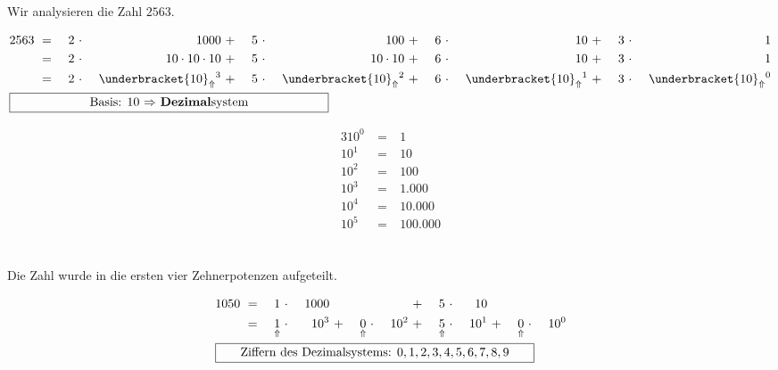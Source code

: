 \begin{example}
Wir analysieren die Zahl $2563$.\\

\begin{minipage}{0.6\textwidth}
\begin{alignat*}{16}
2563 & ~ = ~ & 2 & ~\cdot~ & 1000 & ~ + ~ & 5 & ~\cdot~ & 100 & ~ + ~ & 6 & ~\cdot~ & 10 & ~ + ~ & 3 & ~\cdot~ & 1 \\
& ~ = ~ & 2 & ~\cdot~ & 10 \cdot 10 \cdot 10  & ~ + ~ & 5 & ~\cdot~ & 10 \cdot 10  & ~ + ~ & 6 & ~\cdot~ & 10 & ~ + ~ & 3 & ~\cdot~ & 1 \\
& ~ = ~ & 2 & ~\cdot~ & \underbracket{10}_{\Uparrow}{}^3  & ~ + ~ & 5 & ~\cdot~ & \underbracket{10}_{\Uparrow}{}^2  & ~ + ~ & 6 & ~\cdot~ & \underbracket{10}_{\Uparrow}{}^1 & ~ + ~ & 3 & ~\cdot~ & \underbracket{10}_{\Uparrow}{}^0 \\
\omit\rlap{\framebox[9cm]{Basis: $10$ $\Rightarrow$ \textbf{Dezimal}system}}
\end{alignat*}
\end{minipage}
\hfill
\begin{minipage}{0.3\textwidth}
\begin{alignat*}{3}
10^0 & ~ = ~ & 1	\\
10^1 & ~ = ~ & 10	\\
10^2 & ~ = ~ & 100	\\
10^3 & ~ = ~ & 1.000	\\
10^4 & ~ = ~ & 10.000	\\
10^5 & ~ = ~ & 100.000	\\
\end{alignat*}
\end{minipage}
\\
Die Zahl wurde in die ersten vier Zehnerpotenzen aufgeteilt.
\end{example}

\begin{example}

\begin{alignat*}{16}
1050 & ~ = ~ & 1 & ~\cdot~ & 1000 & & & & & ~ + ~ & 5 & ~\cdot~ & 10 \\
& ~ = ~ & \underset{\Uparrow}{1} & ~\cdot~ & 10^3  & ~ + ~ & \underset{\Uparrow}{0} & ~\cdot~ & 10^2  & ~ + ~ & \underset{\Uparrow}{5} & ~\cdot~ & 10^1 & ~ + ~ & \underset{\Uparrow}{0} & ~\cdot~ & 10^0\\
\omit\rlap{\framebox[9cm]{Ziffern des Dezimalsystems: $0, 1, 2, 3, 4, 5, 6, 7, 8, 9$}}
\end{alignat*}

\end{example}

